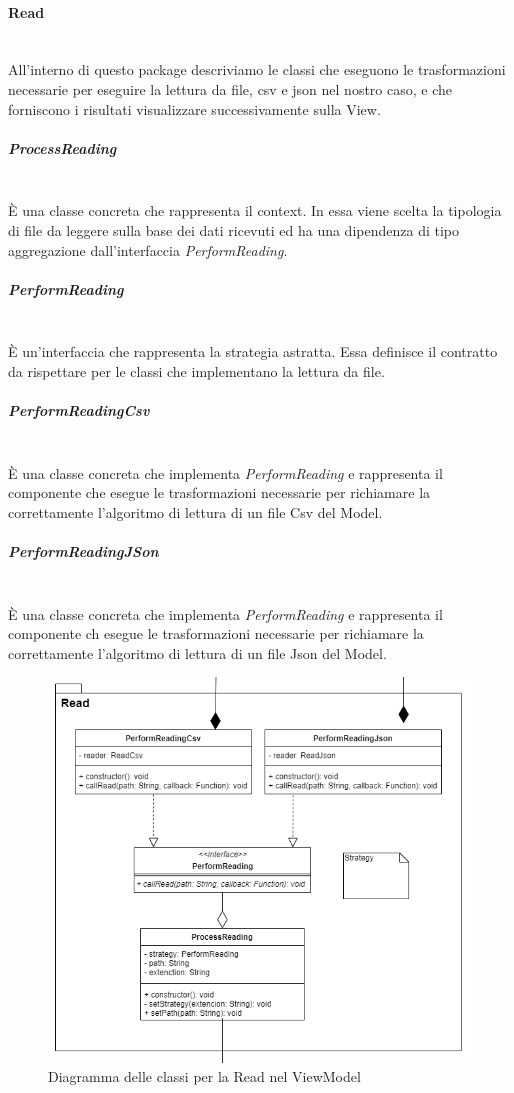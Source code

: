 		\paragraph*{Read} \mbox{} \\[1mm]
		All'interno di questo package descriviamo le classi che eseguono le trasformazioni necessarie per eseguire la lettura da file, csv e json nel nostro caso, e che forniscono i risultati visualizzare successivamente sulla View.
		\subparagraph*{ProcessReading} \mbox{} \\[1mm]
		È una classe concreta che rappresenta il context. In essa viene scelta la tipologia di file da leggere sulla base dei dati ricevuti ed ha una dipendenza di tipo aggregazione dall'interfaccia \textit{PerformReading}.
		\subparagraph*{PerformReading} \mbox{} \\[1mm]
		È un'interfaccia che rappresenta la strategia astratta. Essa definisce il contratto da rispettare per le classi che implementano la lettura da file.
		\subparagraph*{PerformReadingCsv} \mbox{} \\[1mm]
		È una classe concreta che implementa \textit{PerformReading} e rappresenta il componente che esegue le trasformazioni necessarie per richiamare la correttamente l'algoritmo di lettura di un file Csv del Model.
		\subparagraph*{PerformReadingJSon} \mbox{} \\[1mm]
		È una classe concreta che implementa \textit{PerformReading} e rappresenta il componente ch esegue le trasformazioni necessarie per richiamare la correttamente l'algoritmo di lettura di un file Json del Model.
		\mbox{}
				\begin{figure} [H]
					\includegraphics[width=\linewidth]{img/Diagrammi/ViewModel-read-app.png}
					\caption{Diagramma delle classi per la Read nel ViewModel}
				\end{figure}
